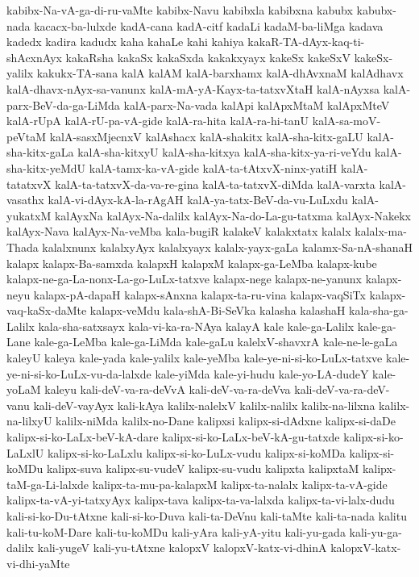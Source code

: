 {kabibx-Na-vA-ga-di-ru-vaMte
kabibx-Navu
kabibxla
kabibxna
kabubx
kabubx-nada
kacacx-ba-lulxde
kadA-cana
kadA-citf
kadaLi
kadaM-ba-liMga
kadava
kadedx
kadira
kadudx
kaha
kahaLe
kahi
kahiya
kakaR-TA-dAyx-kaq-ti-shAcxnAyx
kakaRsha
kakaSx
kakaSxda
kakakxyayx
kakeSx
kakeSxV
kakeSx-yalilx
kakukx-TA-sana
kalA
kalAM
kalA-barxhamx
kalA-dhAvxnaM
kalAdhavx
kalA-dhavx-nAyx-sa-vanunx
kalA-mA-yA-Kayx-ta-tatxvXtaH
kalA-nAyxsa
kalA-parx-BeV-da-ga-LiMda
kalA-parx-Na-vada
kalApi
kalApxMtaM
kalApxMteV
kalA-rUpA
kalA-rU-pa-vA-gide
kalA-ra-hita
kalA-ra-hi-tanU
kalA-sa-moV-peVtaM
kalA-sasxMjecnxV
kalAshacx
kalA-shakitx
kalA-sha-kitx-gaLU
kalA-sha-kitx-gaLa
kalA-sha-kitxyU
kalA-sha-kitxya
kalA-sha-kitx-ya-ri-veYdu
kalA-sha-kitx-yeMdU
kalA-tamx-ka-vA-gide
kalA-ta-tAtxvX-ninx-yatiH
kalA-tatatxvX
kalA-ta-tatxvX-da-va-re-gina
kalA-ta-tatxvX-diMda
kalA-varxta
kalA-vasathx
kalA-vi-dAyx-kA-la-rAgAH
kalA-ya-tatx-BeV-da-vu-LuLxdu
kalA-yukatxM
kalAyxNa
kalAyx-Na-dalilx
kalAyx-Na-do-La-gu-tatxma
kalAyx-Nakekx
kalAyx-Nava
kalAyx-Na-veMba
kala-bugiR
kalakeV
kalakxtatx
kalalx
kalalx-ma-Thada
kalalxnunx
kalalxyAyx
kalalxyayx
kalalx-yayx-gaLa
kalamx-Sa-nA-shanaH
kalapx
kalapx-Ba-samxda
kalapxH
kalapxM
kalapx-ga-LeMba
kalapx-kube
kalapx-ne-ga-La-nonx-La-go-LuLx-tatxve
kalapx-nege
kalapx-ne-yanunx
kalapx-neyu
kalapx-pA-dapaH
kalapx-sAnxna
kalapx-ta-ru-vina
kalapx-vaqSiTx
kalapx-vaq-kaSx-daMte
kalapx-veMdu
kala-shA-Bi-SeVka
kalasha
kalashaH
kala-sha-ga-Lalilx
kala-sha-satxsayx
kala-vi-ka-ra-NAya
kalayA
kale
kale-ga-Lalilx
kale-ga-Lane
kale-ga-LeMba
kale-ga-LiMda
kale-gaLu
kalelxV-shavxrA
kale-ne-le-gaLa
kaleyU
kaleya
kale-yada
kale-yalilx
kale-yeMba
kale-ye-ni-si-ko-LuLx-tatxve
kale-ye-ni-si-ko-LuLx-vu-da-lalxde
kale-yiMda
kale-yi-hudu
kale-yo-LA-dudeY
kale-yoLaM
kaleyu
kali-deV-va-ra-deVvA
kali-deV-va-ra-deVva
kali-deV-va-ra-deV-vanu
kali-deV-vayAyx
kali-kAya
kalilx-nalelxV
kalilx-nalilx
kalilx-na-lilxna
kalilx-na-lilxyU
kalilx-niMda
kalilx-no-Dane
kalipxsi
kalipx-si-dAdxne
kalipx-si-daDe
kalipx-si-ko-LaLx-beV-kA-dare
kalipx-si-ko-LaLx-beV-kA-gu-tatxde
kalipx-si-ko-LaLxlU
kalipx-si-ko-LaLxlu
kalipx-si-ko-LuLx-vudu
kalipx-si-koMDa
kalipx-si-koMDu
kalipx-suva
kalipx-su-vudeV
kalipx-su-vudu
kalipxta
kalipxtaM
kalipx-taM-ga-Li-lalxde
kalipx-ta-mu-pa-kalapxM
kalipx-ta-nalalx
kalipx-ta-vA-gide
kalipx-ta-vA-yi-tatxyAyx
kalipx-tava
kalipx-ta-va-lalxda
kalipx-ta-vi-lalx-dudu
kali-si-ko-Du-tAtxne
kali-si-ko-Duva
kali-ta-DeVnu
kali-taMte
kali-ta-nada
kalitu
kali-tu-koM-Dare
kali-tu-koMDu
kali-yAra
kali-yA-yitu
kali-yu-gada
kali-yu-ga-dalilx
kali-yugeV
kali-yu-tAtxne
kalopxV
kalopxV-katx-vi-dhinA
kalopxV-katx-vi-dhi-yaMte
}
